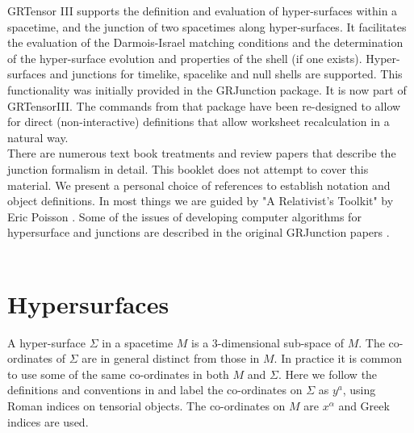 \documentclass{article}
\begin{document}
\grtitle{\grHyperTitle}
\grlabel{\grHyperLabel}
\grtitlepage
%
\copyrightpage
\noindent 
GRTensor III supports the definition and evaluation of hyper-surfaces within a spacetime, and the junction
of two spacetimes along hyper-surfaces. It facilitates the evaluation of the Darmois-Israel matching conditions
and the determination of the hyper-surface evolution and properties of the shell (if one exists). 
Hyper-surfaces and junctions for timelike, spacelike and null shells are supported. This functionality was
initially provided in the GRJunction package. It is now part of GRTensorIII. The commands from that package have been re-designed to allow for
direct (non-interactive) definitions that allow worksheet recalculation in a natural way. \\

There are numerous text book treatments and review papers that describe the junction formalism in detail. This
booklet does not attempt to cover this material. We present a personal choice of references to establish notation
and object definitions. In most things we are guided by "A Relativist's Toolkit" by Eric Poisson \cite{poisson:2004}.
Some of the issues of developing computer algorithms for hypersurface and junctions are described in the original 
GRJunction papers \cite{musgravelake:1996, musgravelake:1997}. \\

\getgrt \\

%
\section{Hypersurfaces}
A hyper-surface $\Sigma$ in a spacetime $M$ is a 3-dimensional sub-space of $M$. The co-ordinates of $\Sigma$ are in 
general distinct from those in $M$. In practice it is common to use some of the same co-ordinates in both $M$ and $\Sigma$. 
Here we follow the definitions and conventions in \cite{poisson:2004} and label the co-ordinates on $\Sigma$ as $y^a$, using Roman indices on tensorial objects. The co-ordinates on $M$ are $x^\alpha$ and Greek indices are used. \\
\end{document}
